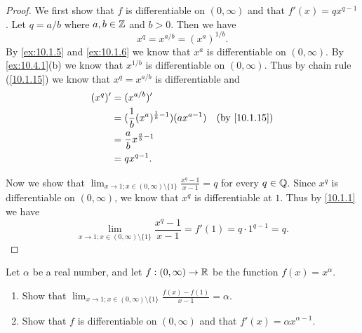 \begin{proof}
  We first show that \(f\) is differentiable on \((0, \infty)\) and that \(f'(x) = q x^{q - 1}\).
  Let \(q = a / b\) where \(a, b \in \mathbb{Z}\) and \(b > 0\).
  Then we have
  \[
    x^q = x^{a / b} = (x^a)^{1 / b}.
  \]
  By \cref{ex:10.1.5} and \cref{ex:10.1.6} we know that \(x^a\) is differentiable on \((0, \infty)\).
  By \cref{ex:10.4.1}(b) we know that \(x^{1 / b}\) is differentiable on \((0, \infty)\).
  Thus by chain rule (\cref{10.1.15}) we know that \(x^q = x^{a / b}\) is differentiable and
  \begin{align*}
    (x^q)' & = (x^{a / b})'                                                                     \\
           & = (\frac{1}{b} (x^a)^{\frac{1}{b} - 1}) (a x^{a - 1}) & \text{(by \cref{10.1.15})} \\
           & = \frac{a}{b} x^{\frac{a}{b} - 1}                                                  \\
           & = q x^{q - 1}.
  \end{align*}

  Now we show that \(\lim_{x \to 1 ; x \in (0, \infty) \setminus \{1\}} \frac{x^q - 1}{x - 1} = q\) for every \(q \in \mathbb{Q}\).
  Since \(x^q\) is differentiable on \((0, \infty)\), we know that \(x^q\) is differentiable at \(1\).
  Thus by \cref{10.1.1} we have
  \[
    \lim_{x \to 1 ; x \in (0, \infty) \setminus \{1\}} \frac{x^q - 1}{x - 1} = f'(1) = q \cdot 1^{q - 1} = q.
  \]
\end{proof}

\begin{ex}\label{ex:10.4.3}
  Let \(\alpha\) be a real number, and let \(f : (0, \infty) \to \mathbb{R}\) be the function \(f(x) = x^{\alpha}\).
  \begin{enumerate}
    \item Show that \(\lim_{x \to 1 ; x \in (0, \infty) \setminus \{1\}} \frac{f(x) - f(1)}{x - 1} = \alpha\).
    \item Show that \(f\) is differentiable on \((0, \infty)\) and that \(f'(x) = \alpha x^{\alpha - 1}\).
  \end{enumerate}
\end{ex}

